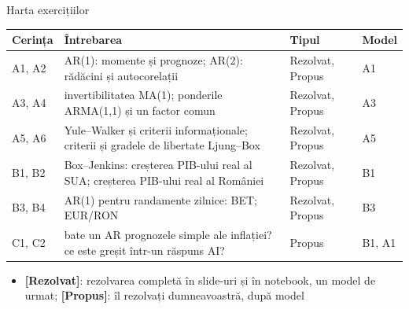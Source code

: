 \begin{frame}{Harta exercițiilor}
\itemsize{\small}
\begin{center}
\footnotesize
\begin{tabular}{>{\raggedright\arraybackslash}p{1.1cm}>{\raggedright\arraybackslash}p{7.5cm}>{\raggedright\arraybackslash}p{1.9cm}>{\raggedright\arraybackslash}p{1.4cm}}
\toprule
\textbf{Cerința} & \textbf{Întrebarea} & \textbf{Tipul} & \textbf{Model} \\
\midrule
A1, A2 & AR(1): momente și prognoze; AR(2): rădăcini și autocorelații & Rezolvat, Propus & A1 \\
A3, A4 & invertibilitatea MA(1); ponderile ARMA(1,1) și un factor comun & Rezolvat, Propus & A3 \\
A5, A6 & Yule--Walker și criterii informaționale; criterii și gradele de libertate Ljung--Box & Rezolvat, Propus & A5 \\
B1, B2 & Box--Jenkins: creșterea PIB-ului real al SUA; creșterea PIB-ului real al României & Rezolvat, Propus & B1 \\
B3, B4 & AR(1) pentru randamente zilnice: BET; EUR/RON & Rezolvat, Propus & B3 \\
C1, C2 & bate un AR prognozele simple ale inflației? ce este greșit într-un răspuns AI? & Propus & B1, A1 \\
\bottomrule
\end{tabular}
\end{center}
\begin{itemize}
    \item \textbf{[Rezolvat]}: rezolvarea completă în slide-uri și în notebook, un model de urmat; \textbf{[Propus]}: îl rezolvați dumneavoastră, după model
\end{itemize}
\end{frame}

